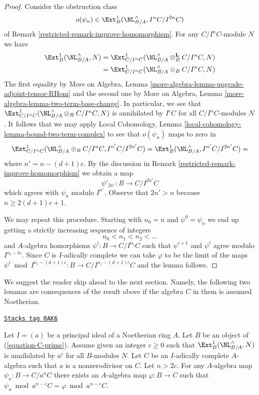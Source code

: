 \begin{proof}

Consider the obstruction class
$$
o(\psi_n) \in \Ext^1_B(\NL_{B/A}^\wedge, I^nC/I^{2n}C)
$$
of Remark \ref{restricted-remark-improve-homomorphism}. For any $C/I^nC$-module
$N$ we have
\begin{align*}
\Ext^1_B(\NL_{B/A}^\wedge, N)
& =
\Ext^1_{C/I^nC}(\NL_{B/A}^\wedge \otimes_B^\mathbf{L} C/I^nC, N) \\
& =
\Ext^1_{C/I^nC}(\NL_{B/A}^\wedge \otimes_B C/I^nC, N)
\end{align*}
The first equality by
More on Algebra, Lemma \ref{more-algebra-lemma-upgrade-adjoint-tensor-RHom}
and the second one by
More on Algebra, Lemma \ref{more-algebra-lemma-two-term-base-change}.
In particular, we see that
$\Ext^1_{C/I^nC}(\NL_{B/A}^\wedge \otimes_B C/I^nC, N)$ is annihilated by
$I^cC$ for all $C/I^nC$-modules $N$.
It follows that we may apply
Local Cohomology, Lemma \ref{local-cohomology-lemma-bound-two-term-complex}
to see that $o(\psi_n)$ maps to zero in
$$
\Ext^1_{C/I^nC}(\NL_{B/A}^\wedge \otimes_B C/I^nC, I^{n'}C/I^{2n'}C) =
\Ext^1_B(\NL_{B/A}^\wedge, I^{n'}C/I^{2n'}C) =
$$
where $n' = n - (d + 1)c$. By the discussion in
Remark \ref{restricted-remark-improve-homomorphism} we obtain a map
$$
\psi'_{2n'} : B \to C/I^{2n'}C
$$
which agrees with $\psi_n$ modulo $I^{n'}$.
Observe that $2n' > n$ because $n \geq 2(d + 1)c + 1$.

\medskip\noindent
We may repeat this procedure. Starting with $n_0 = n$ and
$\psi^0 = \psi_n$ we end up getting a strictly increasing
sequence of integers
$$
n_0 < n_1 < n_2 < \ldots
$$
and $A$-algebra homorphisms $\psi^i : B \to C/I^{n_i}C$
such that $\psi^{i + 1}$ and $\psi^i$ agree modulo $I^{n_i - tc}$.
Since $C$ is $I$-adically complete we can take $\varphi$
to be the limit of the maps
$\psi^i \bmod I^{n_i - (d + 1)c} : B \to C/I^{n_i - (d + 1)c}C$
and the lemma follows.
\end{proof}

We suggest the reader skip ahead to the next section. Namely, the following
two lemmas are consequences of the result above if the algebra $C$ in them
is assumed Noetherian.

\begin{lemma}
\label{restricted-lemma-get-morphism-nonzerodivisor}
\href{https://stacks.math.columbia.edu/tag/0AK6}{\texttt{Stacks tag 0AK6}}

Let $I = (a)$ be a principal ideal of a Noetherian ring $A$.
Let $B$ be an object of (\ref{equation-C-prime}).
Assume given an integer $c \geq 0$ such that $\Ext^1_B(\NL_{B/A}^\wedge, N)$
is annihilated by $a^c$ for all $B$-modules $N$.
Let $C$ be an $I$-adically complete $A$-algebra such that
$a$ is a nonzerodivisor on $C$. Let $n > 2c$. For any $A$-algebra
map $\psi_n : B \to C/a^nC$ there exists an $A$-algebra
map $\varphi : B \to C$ such that
$\psi_n \bmod a^{n - c}C = \varphi \bmod a^{n - c}C$.
\end{lemma}

